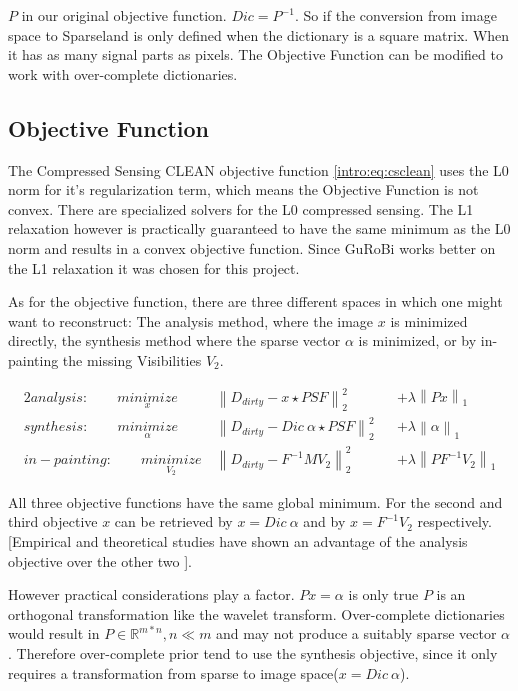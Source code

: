 $P$ in our original objective function. $Dic = P^{-1}$. So if the conversion from image space to Sparseland is only defined when the dictionary is a square matrix. When it has as many signal parts as pixels. The Objective Function can be modified to work with over-complete dictionaries.


\subsection{Objective Function}
The Compressed Sensing CLEAN objective function \eqref{intro:eq:csclean} uses the L0 norm for it's regularization term, which means the Objective Function is not convex. There are specialized solvers for the L0 compressed sensing. The L1 relaxation however is practically guaranteed to have the same minimum as the L0 norm and results in a convex objective function. Since GuRoBi works better on the L1 relaxation it was chosen for this project.

As for the objective function, there are three different spaces in which one might want to reconstruct: The analysis method, where the image $x$ is minimized directly, the synthesis method where the sparse vector $\alpha$ is minimized, or by in-painting the missing Visibilities $V_2$.

\begin{alignat*}{2}
	analysis:\qquad \underset{x}{minimize} \:& \left \| D_{dirty} - x \star PSF \right \|_2^2 &&+  \lambda \left \| Px \right \|_1 \\
	synthesis:\qquad \underset{\alpha}{minimize} \:& \left \| D_{dirty} - Dic \: \alpha \star PSF \right \|_2^2 &&+ \lambda \left \| \alpha \right \|_1 \\
	in-painting:\qquad \underset{V_2}{minimize} \:& \left \| D_{dirty} - F^{-1} M V_2 \right \|_2^2 &&+ \lambda \left \| PF^{-1}V_2\right \|_1
\end{alignat*}

All three objective functions have the same global minimum. For the second and third objective $x$ can be retrieved by $x = Dic\:\alpha$ and by $x = F^{-1}V_2$ respectively. [Empirical and theoretical studies have shown an advantage of the analysis objective over the other two \cite{something}]. 

However practical considerations play a factor. $Px = \alpha$ is only true $P$ is an orthogonal transformation like the wavelet transform. Over-complete dictionaries would result in $P \in \mathbb{R}^{m*n}, n \ll m$ and may not produce a suitably sparse vector $\alpha$. Therefore over-complete prior tend to use the synthesis objective, since it only requires a transformation from sparse to image space($x = Dic\:\alpha$).

